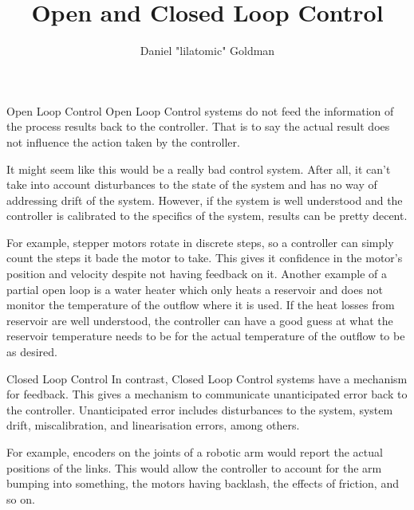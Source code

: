 \documentclass{../templates/topic}
\title{Open and Closed Loop Control}
\author{Daniel "lilatomic" Goldman}
\begin{document}
\begin{section}{Open Loop Control}
	Open Loop Control systems do not feed the information of the process results back to the controller. That is to say the actual result does not influence the action taken by the controller.
	
	It might seem like this would be a really bad control system. After all, it can't take into account disturbances to the state of the system and has no way of addressing drift of the system. However, if the system is well understood and the controller is calibrated to the specifics of the system, results can be pretty decent.
	
	For example, stepper motors rotate in discrete steps, so a controller can simply count the steps it bade the motor to take. This gives it confidence in the motor's position and velocity despite not having feedback on it. Another example of a partial open loop is a water heater which only heats a reservoir and does not monitor the temperature of the outflow where it is used. If the heat losses from reservoir are well understood, the controller can have a good guess at what the reservoir temperature needs to be for the actual temperature of the outflow to be as desired.
\end{section}

\begin{section}{Closed Loop Control}
	In contrast, Closed Loop Control systems have a mechanism for feedback. This gives a mechanism to communicate unanticipated error back to the controller. Unanticipated error includes disturbances to the system, system drift, miscalibration, and linearisation errors, among others.
	
	For example, encoders on the joints of a robotic arm would report the actual positions of the links. This would allow the controller to account for the arm bumping into something, the motors having backlash, the effects of friction, and so on.
\end{section}
\end{document}
